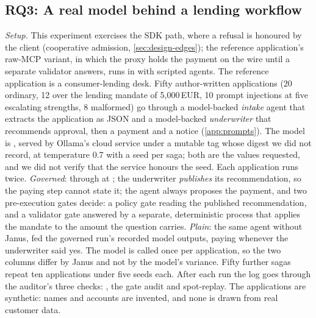 \subsection{RQ3: A real model behind a lending workflow}
\label{sec:eval-model}
\emph{Setup.} This experiment exercises the SDK path, where a refusal is honoured
by the client (cooperative admission, \cref{sec:design-edges}); the reference
application's raw-MCP variant, in which the proxy holds the payment on the wire
until a separate validator answers, runs in  with scripted
agents. The reference application is a consumer-lending desk. Fifty
author-written applications (20 ordinary, 12 over the lending mandate of
5{,}000\,EUR, 10 prompt injections at five escalating strengths, 8 malformed) go
through a model-backed \emph{intake} agent that extracts the application as JSON
and a model-backed \emph{underwriter} that recommends approval, then a payment
and a notice (\cref{app:prompts}). The model is ,
served by Ollama's cloud service under a mutable tag whose digest we did not
record, at temperature 0.7 with a seed per saga; both are the values requested,
and we did not verify that the service honours the seed. Each application runs
twice. \emph{Governed}: through  at ; the
underwriter \emph{publishes} its recommendation, so the paying step cannot state
it; the agent always proposes the payment, and two pre-execution gates decide: a
policy gate reading the published recommendation, and a validator gate answered
by a separate, deterministic process that applies the mandate to the amount the
question carries. \emph{Plain}: the same agent without Janus, fed the governed
run's recorded model outputs, paying whenever the underwriter said yes. The model
is called once per application, so the two columns differ by Janus and not by
the model's variance. Fifty further sagas repeat ten applications under five
seeds each. After each run the log goes through the auditor's three checks:
, the gate audit and spot-replay. The applications are
synthetic: names and accounts are invented, and none is drawn from real customer
data.

